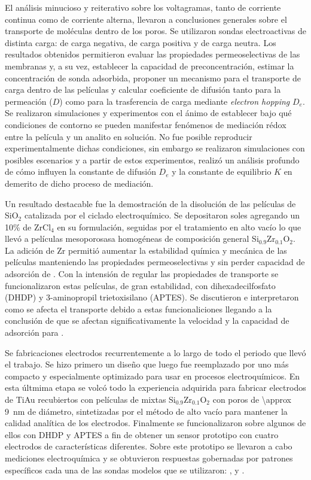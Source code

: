 El análisis minucioso y reiterativo sobre los voltagramas, tanto de corriente continua como de corriente alterna, llevaron a conclusiones generales sobre el transporte de moléculas dentro de los poros. Se utilizaron sondas electroactivas de distinta carga: \ferroferri\space de carga negativa, \aminorutenio\space de carga positiva y \ferroceno\space de carga neutra. Los resultados obtenidos permitieron evaluar las propiedades permeoselectivas de las membranas y, a su vez, establecer la capacidad de preconcentración, estimar la concentración de sonda adsorbida, proponer un mecanismo para el transporte de carga dentro de las películas y calcular coeficiente de difusión tanto para la permeación ($D$) como para la trasferencia de carga mediante \textit{electron hopping} $D_e$.
 Se realizaron simulaciones y experimentos con el ánimo de establecer bajo qué condiciones de contorno se pueden manifestar fenómenos de mediación rédox entre la película y un analito en solución. No fue posible reproducir experimentalmente dichas condiciones, sin embargo se realizaron simulaciones con posibles escenarios y a partir de estos experimentos, realizó un análisis profundo de cómo influyen la constante de difusión $D_e$ y la constante de equilibrio $K$ en demerito de dicho proceso de mediación. 

Un resultado destacable fue la demostración de la disolución de las películas de SiO$_2$ catalizada por el ciclado electroquímico. Se depositaron soles agregando un 10\% de  ZrCl$_4$ en su formulación, seguidas por el tratamiento en alto vacío lo que llevó a películas mesoporosasa homogéneas de composición general Si$_{0.9}$Zr$_{0.1}$O$_2$. La adición de Zr permitió aumentar la estabilidad química y mecánica de las películas manteniendo las propiedades permeoselectivas y sin perder capacidad de adsorción de \aminorutenio. Con la intensión de regular las propiedades de transporte se funcionalizaron estas películas, de gran estabilidad, con dihexadecilfosfato (DHDP) y 3-aminopropil trietoxisilano (APTES). Se discutieron e interpretaron como se afecta el transporte debido a estas funcionaliciones llegando a la conclusión de que se afectan significativamente la velocidad y la capacidad de adsorción para \ru.

Se fabricaciones electrodos recurrentemente a lo largo de todo el periodo que llevó el trabajo. Se hizo primero un diseño que luego fue reemplazado por uno más compacto y especialmente optimizado para usar en procesos electroquímicos. En esta últmima etapa se volcó todo la experiencia adquirida para fabricar electrodos de Ti\textbar Au recubiertos con películas de mixtas Si$_{0.9}$Zr$_{0.1}$O$_2$ con poros de \SI{\approx 9}{\nm} de diámetro, sintetizadas por el método de alto vacío para mantener la calidad analítica de los electrodos. Finalmente se funcionalizaron sobre algunos de ellos con DHDP y APTES a fin de obtener un sensor prototipo con cuatro electrodos de características diferentes. Sobre este prototipo se llevaron a cabo mediciones electroquímica y se obtuvieron respuestas gobernadas por patrones específicos cada una de las sondas modelos que se utilizaron: \ferroferri, \ferroceno\space y \aminorutenio.   

